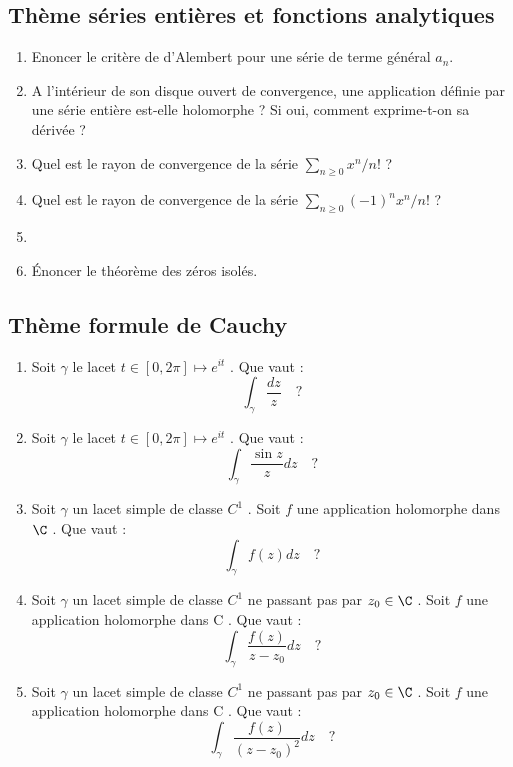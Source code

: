 \documentclass[a4paper, 12pt]{amsart}
\begin{document}
\subsection{Thème séries entières et fonctions analytiques}
\begin{enumerate}
\item Enoncer le critère de d'Alembert pour une série de terme général $a_n$.
\item A l'intérieur de son disque ouvert de convergence, une application définie
par une série entière est-elle holomorphe ? Si oui, comment exprime-t-on sa
dérivée ?
\item Quel est le rayon de convergence de la série $\sum_{n \geq 0} x^n / n!$ ?
\item Quel est le rayon de convergence de la série $\sum_{n \geq 0} (-1)^n x^n / n!$ ?
\item
\item Énoncer le théorème des zéros isolés.
\end{enumerate}
\subsection{Thème formule de Cauchy}
\begin{enumerate}
	\item Soit $\gamma$ le lacet $t \in [0, 2\pi] \mapsto e^{it}$ . Que vaut :
	\[
	\int_\gamma \frac{dz}{z} \quad ?
	\] 
	\item Soit $\gamma$ le lacet $t \in [0, 2\pi] \mapsto e^{it}$ . Que vaut :
	\[
	\int_\gamma \frac{\sin z}{z} dz \quad ?
	\] 
	\item Soit $\gamma$ un lacet simple de classe $C^1$ . Soit $f$ une application holomorphe dans
	$\C$ . Que vaut :
		\[
	\int_\gamma f(z) dz \quad ?
	\] 
	\item Soit  $\gamma$  un lacet simple de classe $C^1$ ne passant pas par $z_0 \in \C$ . Soit $f$ une
	application holomorphe dans C . Que vaut :
	\[
\int_\gamma \frac{f(z)}{z-z_0} dz \quad ?
\] 
		\item Soit  $\gamma$  un lacet simple de classe $C^1$ ne passant pas par $z_0 \in \C$ . Soit $f$ une
	application holomorphe dans C . Que vaut :
	\[
	\int_\gamma \frac{f(z)}{(z-z_0)^2} dz \quad ?
	\] 
\end{enumerate}
\end{document}
